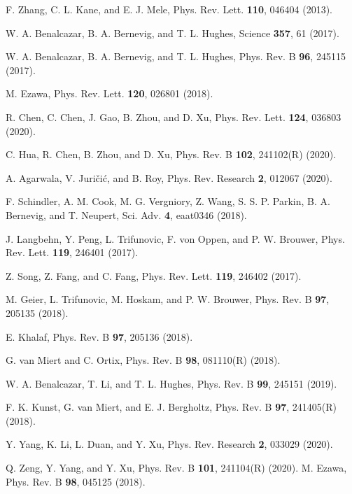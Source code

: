 \documentclass[aps,prl,twocolumn,showpacs,superscriptaddress]{revtex4-1}
\begin{document}
\begin{thebibliography}{99}

F. Zhang, C. L. Kane, and E. J. Mele, Phys. Rev. Lett. \textbf{110}, 046404 (2013).

W. A. Benalcazar, B. A. Bernevig, and T. L. Hughes, Science \textbf{357}, 61 (2017).

W. A. Benalcazar, B. A. Bernevig, and T. L. Hughes, Phys. Rev. B \textbf{96}, 245115 (2017).

M. Ezawa, Phys. Rev. Lett. \textbf{120}, 026801 (2018).

R. Chen, C. Chen, J. Gao, B. Zhou, and D. Xu, Phys. Rev. Lett. \textbf{124}, 036803 (2020).

C. Hua, R. Chen, B. Zhou, and D. Xu, Phys. Rev. B \textbf{102}, 241102(R) (2020).

A. Agarwala, V. Juri\v{c}i\'{c}, and B. Roy, Phys. Rev. Research \textbf{2}, 012067 (2020).

F. Schindler, A. M. Cook, M. G. Vergniory, Z. Wang, S. S. P. Parkin, B. A. Bernevig, and T. Neupert, Sci. Adv. \textbf{4}, eaat0346 (2018).

J. Langbehn, Y. Peng, L. Trifunovic, F. von Oppen, and P. W. Brouwer, Phys. Rev. Lett. \textbf{119}, 246401 (2017).

Z. Song, Z. Fang, and C. Fang, Phys. Rev. Lett. \textbf{119}, 246402 (2017).

M. Geier, L. Trifunovic, M. Hoskam, and P. W. Brouwer, Phys. Rev. B \textbf{97}, 205135 (2018).

E. Khalaf, Phys. Rev. B \textbf{97}, 205136 (2018).

G. van Miert and C. Ortix, Phys. Rev. B \textbf{98}, 081110(R) (2018).

W. A. Benalcazar, T. Li, and T. L. Hughes, Phys. Rev. B \textbf{99}, 245151 (2019).

F. K. Kunst, G. van Miert, and E. J. Bergholtz, Phys. Rev. B \textbf{97}, 241405(R) (2018).

Y. Yang, K. Li, L. Duan, and Y. Xu, Phys. Rev. Research \textbf{2}, 033029 (2020).

Q. Zeng, Y. Yang, and Y. Xu, Phys. Rev. B \textbf{101}, 241104(R) (2020).
%
M. Ezawa, Phys. Rev. B \textbf{98}, 045125 (2018).


\end{thebibliography}
\end{document}

